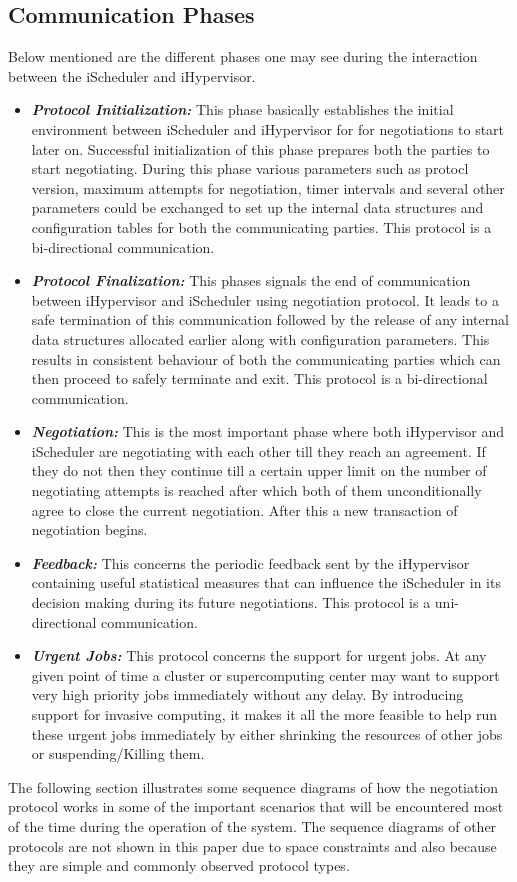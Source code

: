 \documentclass{acm_proc_article-sp}
\begin{document}
\subsection{Communication Phases}
Below mentioned are the different phases one may see during the interaction between the iScheduler and iHypervisor.
\begin{itemize}
\item \textbf{\textit{Protocol Initialization:}} This phase basically establishes the initial environment between iScheduler and iHypervisor for for negotiations to start later on. Successful initialization of this phase prepares both the parties to start negotiating. During this phase various parameters such as protocl version, maximum attempts for negotiation, timer intervals and several other parameters could be exchanged to set up the internal data structures and configuration tables for both the communicating parties. This protocol is a bi-directional communication.
\item \textbf{\textit{Protocol Finalization:}} This phases signals the end of communication between iHypervisor and iScheduler using negotiation protocol. It leads to a safe termination of this communication followed by the release of any internal data structures allocated earlier along with configuration parameters. This results in consistent behaviour of both the communicating parties which can then proceed to safely terminate and exit. This protocol is a bi-directional communication.
\item \textbf{\textit{Negotiation:}} This is the most important phase where both iHypervisor and iScheduler are negotiating with each other till they reach an agreement. If they do not then they continue till a certain upper limit on the number of negotiating attempts is reached after which both of them unconditionally agree to close the current negotiation. After this a new transaction of negotiation begins.
\item \textbf{\textit{Feedback:}} This concerns the periodic feedback sent by the iHypervisor containing useful statistical measures that can influence the iScheduler in its decision making during its future negotiations. This protocol is a uni-directional communication.
\item \textbf{\textit{Urgent Jobs:}} This protocol concerns the support for urgent jobs. At any given point of time a cluster or supercomputing center may want to support very high priority jobs immediately without any delay. By introducing support for invasive computing, it makes it all the more feasible to help run these urgent jobs immediately by either shrinking the resources of other jobs or suspending/Killing them. 
\end{itemize}
The following section illustrates some sequence diagrams of how the negotiation protocol works in some of the important scenarios that will be encountered most of the time during the operation of the system. The sequence diagrams of other protocols are not shown in this paper due to space constraints and also because they are simple and commonly observed protocol types.
\end{document}
